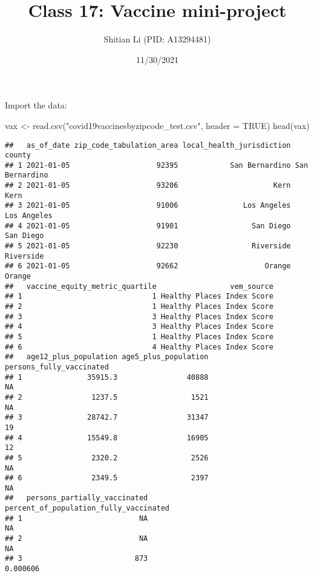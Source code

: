 \documentclass[
]{article}
\title{Class 17: Vaccine mini-project}
\author{Shitian Li (PID: A13294481)}
\date{11/30/2021}
\newenvironment{Shaded}{\begin{snugshade}}{\end{snugshade}}
\newcommand{\AttributeTok}[1]{\textcolor[rgb]{0.77,0.63,0.00}{#1}}
\newcommand{\ConstantTok}[1]{\textcolor[rgb]{0.00,0.00,0.00}{#1}}
\newcommand{\FunctionTok}[1]{\textcolor[rgb]{0.00,0.00,0.00}{#1}}
\newcommand{\NormalTok}[1]{#1}
\newcommand{\OtherTok}[1]{\textcolor[rgb]{0.56,0.35,0.01}{#1}}
\newcommand{\StringTok}[1]{\textcolor[rgb]{0.31,0.60,0.02}{#1}}
\begin{document}
\maketitle

Import the data:

\begin{Shaded}
\begin{Highlighting}[]
\NormalTok{vax }\OtherTok{\textless{}{-}} \FunctionTok{read.csv}\NormalTok{(}\StringTok{"covid19vaccinesbyzipcode\_test.csv"}\NormalTok{, }\AttributeTok{header =} \ConstantTok{TRUE}\NormalTok{)}
\FunctionTok{head}\NormalTok{(vax)}
\end{Highlighting}
\end{Shaded}

\begin{verbatim}
##   as_of_date zip_code_tabulation_area local_health_jurisdiction         county
## 1 2021-01-05                    92395            San Bernardino San Bernardino
## 2 2021-01-05                    93206                      Kern           Kern
## 3 2021-01-05                    91006               Los Angeles    Los Angeles
## 4 2021-01-05                    91901                 San Diego      San Diego
## 5 2021-01-05                    92230                 Riverside      Riverside
## 6 2021-01-05                    92662                    Orange         Orange
##   vaccine_equity_metric_quartile                 vem_source
## 1                              1 Healthy Places Index Score
## 2                              1 Healthy Places Index Score
## 3                              3 Healthy Places Index Score
## 4                              3 Healthy Places Index Score
## 5                              1 Healthy Places Index Score
## 6                              4 Healthy Places Index Score
##   age12_plus_population age5_plus_population persons_fully_vaccinated
## 1               35915.3                40888                       NA
## 2                1237.5                 1521                       NA
## 3               28742.7                31347                       19
## 4               15549.8                16905                       12
## 5                2320.2                 2526                       NA
## 6                2349.5                 2397                       NA
##   persons_partially_vaccinated percent_of_population_fully_vaccinated
## 1                           NA                                     NA
## 2                           NA                                     NA
## 3                          873                               0.000606

\end{verbatim}
\end{document}
